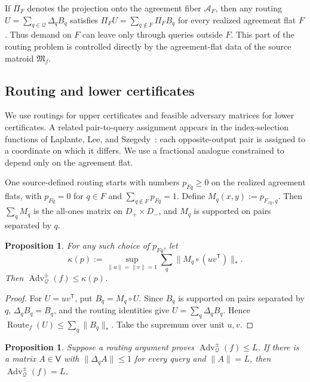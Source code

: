 \documentclass[11pt]{article}
\numberwithin{equation}{section}
\newtheorem{proposition}[definition]{Proposition}
\theoremstyle{remark}
\begin{document}
If $\Pi_F$ denotes the projection onto the agreement fiber $\mathcal A_F$, then any routing $U=\sum_{q\in\mathcal Q}\Delta_qB_q$ satisfies $\Pi_FU=\sum_{q\notin F}\Pi_FB_q$ for every realized agreement flat $F$.  Thus demand on $F$ can leave only
through queries outside $F$. This part of the routing problem is controlled
directly by the agreement-flat data of the source matroid $\mathfrak M_f$.

\subsection{Routing and lower certificates}
\label{subsec:source-routing-certificates}

We use routings for upper certificates and feasible adversary matrices for
lower certificates. A related pair-to-query assignment appears in the
index-selection functions of Laplante, Lee, and
Szegedy~\cite{LaplanteLeeSzegedy2006}: each opposite-output pair is assigned
to a coordinate on which it differs. We use a fractional analogue constrained
to depend only on the agreement flat.

One source-defined routing starts with numbers $p_{Fq}\geq0$ on the
realized agreement flats, with $p_{Fq}=0$ for $q\in F$ and
$\sum_{q\notin F}p_{Fq}=1$.  Define
$M_q(x,y):=p_{F_{xy},q}$.  Then $\sum_qM_q$ is the all-ones matrix on
$D_+\times D_-$, and $M_q$ is supported on pairs separated by $q$.

\begin{proposition}
\label{prop:scalar-flat-routing-certificate}
For any such choice of $p_{Fq}$, let
\begin{equation}
    \kappa(p)
    :=
    \sup_{\|u\|=\|v\|=1}
        \sum_q\|M_q\circ(uv^{\mathsf T})\|_*.
\end{equation}
Then $\operatorname{Adv}^{\pm}_{\mathcal Q}(f)\leq\kappa(p)$.
\end{proposition}

\begin{proof}
For $U=uv^{\mathsf T}$, put $B_q=M_q\circ U$.  Since $B_q$ is supported on
pairs separated by $q$, $\Delta_qB_q=B_q$, and the routing identities give
$U=\sum_q\Delta_qB_q$.  Hence
$\operatorname{Route}_f(U)\leq\sum_q\|B_q\|_*$. Take the supremum over unit $u,v$.
\end{proof}

\begin{proposition}
\label{prop:routing-potential-optimality}
Suppose a routing argument proves
$\operatorname{Adv}^{\pm}_{\mathcal Q}(f)\leq L$.  If there is a matrix
$A\in\mathsf V$ with $\|\Delta_qA\|\leq1$ for every query and $\|A\|=L$,
then $\operatorname{Adv}^{\pm}_{\mathcal Q}(f)=L$.
\end{proposition}
\end{document}
